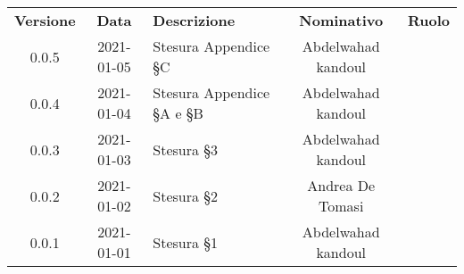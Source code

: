 {
    \renewcommand{\arraystretch}{1.5}
    \centering
    \begin{longtable}{ c c  C{4cm}  c  c }
        \rowcolor{\primaryColor}
        \textcolor{\secondaryColor}{
        \textbf{Versione}}     & \textcolor{\secondaryColor}{\textbf{Data}}       & \textcolor{\secondaryColor}
        {\textbf{Descrizione}} & \textcolor{\secondaryColor}{\textbf{Nominativo}} & \textcolor{\secondaryColor}{\textbf{Ruolo}}                          \\


        0.0.5                  & 2021-01-05                                       & Stesura Appendice §C                         & Abdelwahad kandoul & \redattore{} \\
        0.0.4                  & 2021-01-04                                       & Stesura Appendice §A e §B                          & Abdelwahad kandoul & \redattore{} \\
        0.0.3                  & 2021-01-03                                       & Stesura §3                            & Abdelwahad kandoul & \redattore{} \\
        0.0.2                  & 2021-01-02                                       & Stesura §2                              & Andrea De Tomasi & \redattore{} \\
        0.0.1                  & 2021-01-01                                       & Stesura §1                            & Abdelwahad kandoul & \redattore{} \\
    
    
    \end{longtable}
}